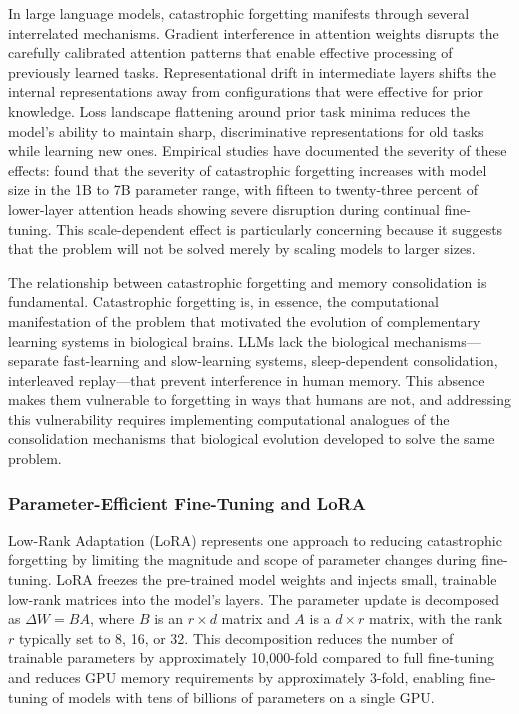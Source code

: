\documentclass[11pt,letterpaper]{article}
\begin{document}
In large language models, catastrophic forgetting manifests through several interrelated mechanisms. Gradient interference in attention weights disrupts the carefully calibrated attention patterns that enable effective processing of previously learned tasks. Representational drift in intermediate layers shifts the internal representations away from configurations that were effective for prior knowledge. Loss landscape flattening around prior task minima reduces the model's ability to maintain sharp, discriminative representations for old tasks while learning new ones. Empirical studies have documented the severity of these effects: \cite{luo2023empirical} found that the severity of catastrophic forgetting increases with model size in the 1B to 7B parameter range, with fifteen to twenty-three percent of lower-layer attention heads showing severe disruption during continual fine-tuning. This scale-dependent effect is particularly concerning because it suggests that the problem will not be solved merely by scaling models to larger sizes.

The relationship between catastrophic forgetting and memory consolidation is fundamental. Catastrophic forgetting is, in essence, the computational manifestation of the problem that motivated the evolution of complementary learning systems in biological brains. LLMs lack the biological mechanisms---separate fast-learning and slow-learning systems, sleep-dependent consolidation, interleaved replay---that prevent interference in human memory. This absence makes them vulnerable to forgetting in ways that humans are not, and addressing this vulnerability requires implementing computational analogues of the consolidation mechanisms that biological evolution developed to solve the same problem.

\subsubsection{Parameter-Efficient Fine-Tuning and LoRA}

Low-Rank Adaptation (LoRA) \cite{hu2022lora} represents one approach to reducing catastrophic forgetting by limiting the magnitude and scope of parameter changes during fine-tuning. LoRA freezes the pre-trained model weights and injects small, trainable low-rank matrices into the model's layers. The parameter update is decomposed as $\Delta W = BA$, where $B$ is an $r \times d$ matrix and $A$ is a $d \times r$ matrix, with the rank $r$ typically set to 8, 16, or 32. This decomposition reduces the number of trainable parameters by approximately 10,000-fold compared to full fine-tuning and reduces GPU memory requirements by approximately 3-fold, enabling fine-tuning of models with tens of billions of parameters on a single GPU.
\end{document}
